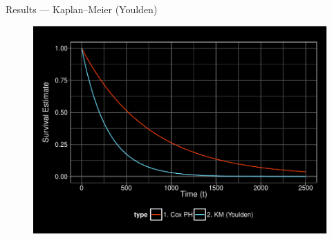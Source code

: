 \documentclass[12pt,t]{beamer}
\begin{document}
\begin{frame}[c]{Results --- Kaplan--Meier (Youlden)}

\begin{center}
\begin{figure}[H]
\begin{center}
\includegraphics[width=\textwidth]{Figs/s1_cox_youlden.pdf}
\end{center}
\end{figure}
\end{center}

\note{
}

\end{frame}

\end{document}
